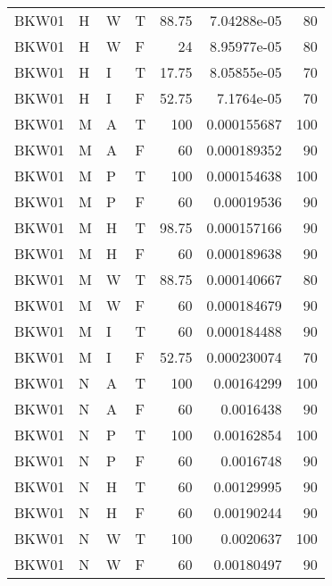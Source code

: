 \begin{longtable}{llllrrr}
    BKW01    & H     & W     & T          & 88.75      & 7.04288e-05 & 80       \\
    BKW01    & H     & W     & F          & 24         & 8.95977e-05 & 80       \\
    BKW01    & H     & I     & T          & 17.75      & 8.05855e-05 & 70       \\
    BKW01    & H     & I     & F          & 52.75      & 7.1764e-05  & 70       \\
    BKW01    & M     & A     & T          & 100        & 0.000155687 & 100      \\
    BKW01    & M     & A     & F          & 60         & 0.000189352 & 90       \\
    BKW01    & M     & P     & T          & 100        & 0.000154638 & 100      \\
    BKW01    & M     & P     & F          & 60         & 0.00019536  & 90       \\
    BKW01    & M     & H     & T          & 98.75      & 0.000157166 & 90       \\
    BKW01    & M     & H     & F          & 60         & 0.000189638 & 90       \\
    BKW01    & M     & W     & T          & 88.75      & 0.000140667 & 80       \\
    BKW01    & M     & W     & F          & 60         & 0.000184679 & 90       \\
    BKW01    & M     & I     & T          & 60         & 0.000184488 & 90       \\
    BKW01    & M     & I     & F          & 52.75      & 0.000230074 & 70       \\
    BKW01    & N     & A     & T          & 100        & 0.00164299  & 100      \\
    BKW01    & N     & A     & F          & 60         & 0.0016438   & 90       \\
    BKW01    & N     & P     & T          & 100        & 0.00162854  & 100      \\
    BKW01    & N     & P     & F          & 60         & 0.0016748   & 90       \\
    BKW01    & N     & H     & T          & 60         & 0.00129995  & 90       \\
    BKW01    & N     & H     & F          & 60         & 0.00190244  & 90       \\
    BKW01    & N     & W     & T          & 100        & 0.0020637   & 100      \\
    BKW01    & N     & W     & F          & 60         & 0.00180497  & 90       \\

\end{longtable}

